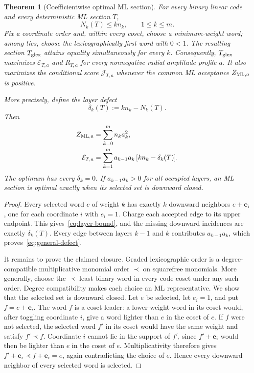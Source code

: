 \documentclass[journal]{IEEEtran}
\newtheorem{theorem}{Theorem}
\theoremstyle{definition}
\theoremstyle{remark}
\begin{document}
\begin{theorem}[Coefficientwise optimal ML section]
\label{thm:universal-ml}
For every binary linear code and every deterministic ML section $T$,
\begin{equation}
 N_k(T)\le k n_k,\qquad 1\le k\le m.
 \label{eq:layer-bound}
\end{equation}
Fix a coordinate order and, within every coset, choose a minimum-weight word;
among ties, choose the lexicographically first word with $0<1$.  The resulting
section $T_{\rm glex}$ attains equality simultaneously for every $k$.
Consequently, $T_{\rm glex}$ maximizes $\mathcal E_{T,a}$ and $R_{T,a}$ for
every nonnegative radial amplitude profile $a$.  It also maximizes the
conditional score $\mathcal J_{T,a}$ whenever the common ML acceptance
$Z_{{\rm ML},a}$ is positive.

More precisely, define the layer defect
\begin{equation}
 \delta_k(T):=k n_k-N_k(T).
 \label{eq:layer-defect}
\end{equation}
Then
\begin{align}
 Z_{{\rm ML},a}&=\sum_{k=0}^m n_k a_k^2,
 \label{eq:general-ml-Z}\\
 \mathcal E_{T,a}
 &=\sum_{k=1}^m a_{k-1}a_k\,[k n_k-\delta_k(T)].
 \label{eq:general-defect}
\end{align}
The optimum has every $\delta_k=0$.  If $a_{k-1}a_k>0$ for all occupied
layers, an ML section is optimal exactly when its selected set is downward
closed.
\end{theorem}

\begin{proof}
Every selected word $e$ of weight $k$ has exactly $k$ downward neighbors
$e+\mathbf e_i$, one for each coordinate $i$ with $e_i=1$.  Charge each
accepted edge to its upper endpoint.
This gives~\eqref{eq:layer-bound}, and the missing downward incidences are
exactly $\delta_k(T)$.  Every edge between layers $k-1$ and $k$ contributes
$a_{k-1}a_k$, which proves~\eqref{eq:general-defect}.

It remains to prove the claimed closure.  Graded lexicographic order is a
degree-compatible multiplicative monomial order $\prec$ on squarefree
monomials.  More generally, choose the $\prec$-least binary word in every code
coset under any such order.
Degree compatibility makes each choice an ML representative.  We show that
the selected set is downward closed.  Let $e$ be selected, let $e_i=1$, and
 put $f=e+\mathbf e_i$.  The word $f$ is a coset leader: a lower-weight word in its
coset would, after toggling coordinate $i$, give a word lighter than $e$ in
the coset of $e$.  If $f$ were not selected, the selected word $f'$ in its
coset would have the same weight and satisfy $f'\prec f$.  Coordinate $i$
cannot lie in the support of $f'$, since $f'+\mathbf e_i$ would then be lighter than
$e$ in the coset of $e$.  Multiplicativity therefore gives
$f'+\mathbf e_i\prec f+\mathbf e_i=e$, again contradicting the choice of $e$.  Hence every
downward neighbor of every selected word is selected.
\end{proof}
\end{document}
